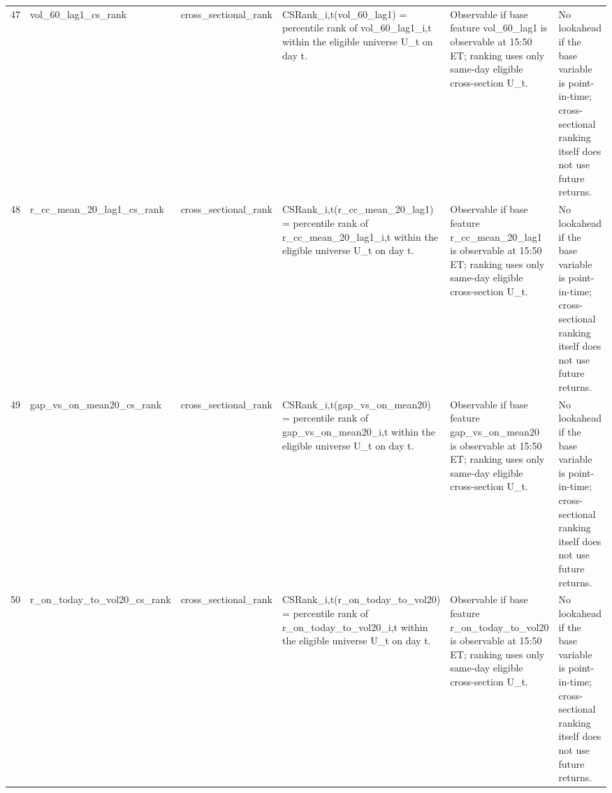 \begin{landscape}
\begin{longtable}{P{0.42cm} P{2.25cm} P{2.05cm} P{5.25cm} P{4.85cm} P{5.25cm}}
47 & vol\_\allowbreak{}60\_\allowbreak{}lag1\_\allowbreak{}cs\_\allowbreak{}rank & cross\_\allowbreak{}sectional\_\allowbreak{}rank & CSRank\_\allowbreak{}i,t(vol\_\allowbreak{}60\_\allowbreak{}lag1) = percentile rank of vol\_\allowbreak{}60\_\allowbreak{}lag1\_\allowbreak{}i,t within the eligible universe U\_\allowbreak{}t on day t. & Observable if base feature vol\_\allowbreak{}60\_\allowbreak{}lag1 is observable at 15:50 ET; ranking uses only same-day eligible cross-section U\_\allowbreak{}t. & No lookahead if the base variable is point-in-time; cross-sectional ranking itself does not use future returns. \\
48 & r\_\allowbreak{}cc\_\allowbreak{}mean\_\allowbreak{}20\_\allowbreak{}lag1\_\allowbreak{}cs\_\allowbreak{}rank & cross\_\allowbreak{}sectional\_\allowbreak{}rank & CSRank\_\allowbreak{}i,t(r\_\allowbreak{}cc\_\allowbreak{}mean\_\allowbreak{}20\_\allowbreak{}lag1) = percentile rank of r\_\allowbreak{}cc\_\allowbreak{}mean\_\allowbreak{}20\_\allowbreak{}lag1\_\allowbreak{}i,t within the eligible universe U\_\allowbreak{}t on day t. & Observable if base feature r\_\allowbreak{}cc\_\allowbreak{}mean\_\allowbreak{}20\_\allowbreak{}lag1 is observable at 15:50 ET; ranking uses only same-day eligible cross-section U\_\allowbreak{}t. & No lookahead if the base variable is point-in-time; cross-sectional ranking itself does not use future returns. \\
49 & gap\_\allowbreak{}vs\_\allowbreak{}on\_\allowbreak{}mean20\_\allowbreak{}cs\_\allowbreak{}rank & cross\_\allowbreak{}sectional\_\allowbreak{}rank & CSRank\_\allowbreak{}i,t(gap\_\allowbreak{}vs\_\allowbreak{}on\_\allowbreak{}mean20) = percentile rank of gap\_\allowbreak{}vs\_\allowbreak{}on\_\allowbreak{}mean20\_\allowbreak{}i,t within the eligible universe U\_\allowbreak{}t on day t. & Observable if base feature gap\_\allowbreak{}vs\_\allowbreak{}on\_\allowbreak{}mean20 is observable at 15:50 ET; ranking uses only same-day eligible cross-section U\_\allowbreak{}t. & No lookahead if the base variable is point-in-time; cross-sectional ranking itself does not use future returns. \\
50 & r\_\allowbreak{}on\_\allowbreak{}today\_\allowbreak{}to\_\allowbreak{}vol20\_\allowbreak{}cs\_\allowbreak{}rank & cross\_\allowbreak{}sectional\_\allowbreak{}rank & CSRank\_\allowbreak{}i,t(r\_\allowbreak{}on\_\allowbreak{}today\_\allowbreak{}to\_\allowbreak{}vol20) = percentile rank of r\_\allowbreak{}on\_\allowbreak{}today\_\allowbreak{}to\_\allowbreak{}vol20\_\allowbreak{}i,t within the eligible universe U\_\allowbreak{}t on day t. & Observable if base feature r\_\allowbreak{}on\_\allowbreak{}today\_\allowbreak{}to\_\allowbreak{}vol20 is observable at 15:50 ET; ranking uses only same-day eligible cross-section U\_\allowbreak{}t. & No lookahead if the base variable is point-in-time; cross-sectional ranking itself does not use future returns. \\

\end{longtable}
\end{landscape}
